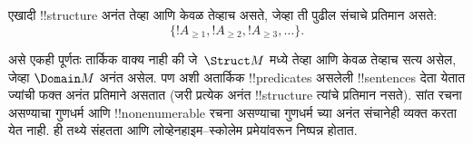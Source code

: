 \documentclass[../../../include/open-logic-section]{subfiles}
\begin{document}
\begin{prop}
एखादी !!{structure} अनंत तेव्हा आणि केवळ तेव्हाच असते, जेव्हा ती पुढील
संचाचे प्रतिमान असते:
\[
\{!A_{\ge 1}, !A_{\ge 2}, !A_{\ge 3}, \dots \}.
\]
\end{prop}

असे एकही पूर्णतः तार्किक वाक्य नाही की जे~$\Struct M$ मध्ये तेव्हा आणि केवळ
तेव्हाच सत्य असेल, जेव्हा $\Domain M$ अनंत असेल. पण अशी अतार्किक
!!{predicate}s असलेली !!{sentence}s देता येतात ज्यांची फक्त अनंत प्रतिमाने
असतात (जरी प्रत्येक अनंत !!{structure} त्यांचे प्रतिमान नसते). सांत रचना
असण्याचा गुणधर्म आणि !!{nonenumerable} रचना असण्याचा गुणधर्म
च्या अनंत संचानेही व्यक्त करता येत नाही. ही तथ्ये संहतता आणि
लोव्हेनहाइम--स्कोलेम प्रमेयांवरून निष्पन्न होतात.
\end{document}
